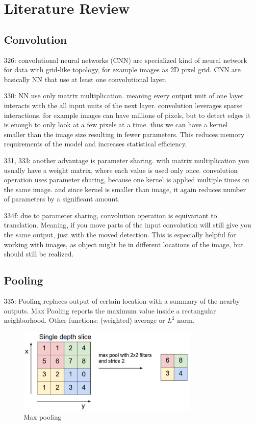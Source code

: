 \section{Literature Review}

\subsection{Convolution}
\cite{DLbook16}
326: convolutional neural networks (CNN) are specialized kind of neural network for data with grid-like topology, for example images as 2D pixel grid. CNN are basically NN that use at least one convolutional layer.

330: NN use only matrix multiplication. meaning every output unit of one layer interacts with the all input units of the next layer. convolution leverages sparse interactions. for example images can have millions of pixels, but to detect edges it is enough to only look at a few pixels at a time. thus we can have a kernel smaller than the image size resulting in fewer parameters. This reduces memory requirements of the model and increases statistical efficiency.

331, 333: another advantage is parameter sharing. with matrix multiplication you usually have a weight matrix, where each value is used only once. convolution operation uses parameter sharing, because one kernel is applied multiple times on the same image. and since kernel is smaller than image, it again reduces number of parameters by a significant amount.

334f: due to parameter sharing, convolution operation is equivariant to translation. Meaning, if you move parts of the input convolution will still give you the same output, just with the moved detection. This is especially helpful for working with images, as object might be in different locations of the image, but should still be realized.

\subsection{Pooling}
\cite{DLbook16}
335: Pooling replaces output of certain location with a summary of the nearby outputs. Max Pooling reports the maximum value inside a rectangular neighborhood. Other functions: (weighted) average or $L^2$ norm.


\begin{figure}[h]
    \centering
    \includegraphics[width=0.8\textwidth]{images/maxpool}
    \caption{Max pooling \cite{stanford_convnet}}
    \label{fig:pooling}
\end{figure}

